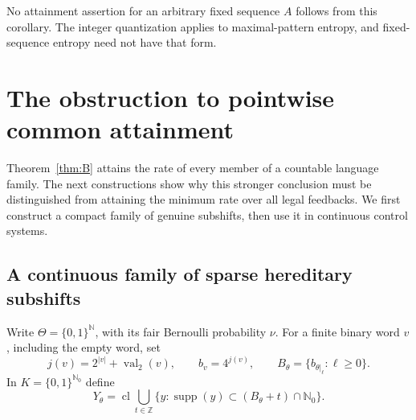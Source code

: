 \documentclass[11pt,reqno]{amsart}
\numberwithin{equation}{section}
\theoremstyle{definition}
\newcommand{\N}{\mathbb N}
\newcommand{\Nzero}{\mathbb N_0}
\newcommand{\supp}{\operatorname{supp}}
\begin{document}
No attainment assertion for an arbitrary fixed sequence $A$ follows
from this corollary. The integer quantization applies to maximal-pattern
entropy, and fixed-sequence entropy need not have that form.

\section{The obstruction to pointwise common attainment}
\label{app:pointwise}

Theorem~\ref{thm:B} attains the rate of every member of a countable
language family. The next constructions show why this stronger
conclusion must be distinguished from attaining the minimum rate
over all legal feedbacks. We first construct a compact family of
genuine subshifts, then use it in continuous control systems.

\subsection{A continuous family of sparse hereditary subshifts}

Write $\Theta=\{0,1\}^{\N}$, with its fair Bernoulli probability
$\nu$. For a finite binary word $v$, including the empty word, set
\[
 j(v)=2^{|v|}+\operatorname{val}_2(v),\qquad
 b_v=4^{j(v)},\qquad
 B_\theta=\{b_{\theta|_\ell}:\ell\ge0\}.
\]
In $K=\{0,1\}^{\Nzero}$ define
\[
 Y_\theta=
 \operatorname{cl}\bigcup_{t\in\mathbb Z}
 \{y:\supp(y)\subset(B_\theta+t)\cap\Nzero\}.
\]
\end{document}
